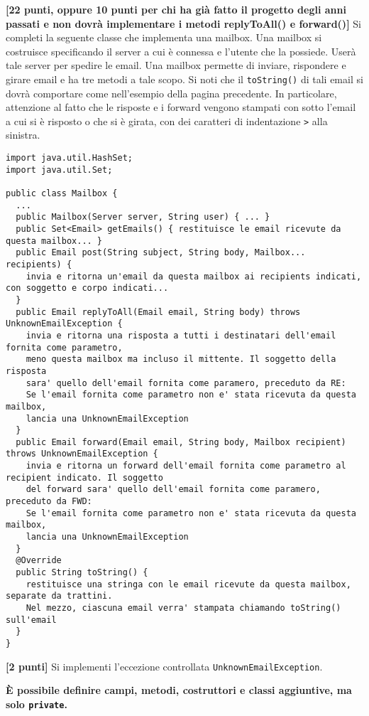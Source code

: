 \documentclass{article}[10pt]
\newcounter{esnu}
\newenvironment{esercizio}{\medskip \noindent {\bf Esercizio\addtocounter{esnu}{1} \arabic{esnu}}}{}
\begin{document}
\begin{esercizio}
\textbf{[22 punti, oppure 10 punti per chi ha gi\`a fatto il progetto degli anni passati e non dovr\`a implementare i metodi replyToAll() e forward()]}
Si completi la seguente classe che implementa una mailbox.
Una mailbox si costruisce specificando il server a cui \`e connessa
e l'utente che la possiede. User\`a tale server per spedire le email.
Una mailbox permette di inviare, rispondere e girare email e ha tre metodi
a tale scopo. Si noti che il \texttt{toString()}
di tali email si dovr\`a comportare come nell'esempio della pagina precedente.
In particolare, attenzione al fatto che le risposte e i forward vengono stampati
con sotto l'email a cui si \`e risposto o che si \`e girata, con dei caratteri
di indentazione \texttt{>} alla sinistra.

{\small\begin{verbatim}
import java.util.HashSet;
import java.util.Set;

public class Mailbox {
  ...
  public Mailbox(Server server, String user) { ... }
  public Set<Email> getEmails() { restituisce le email ricevute da questa mailbox... }
  public Email post(String subject, String body, Mailbox... recipients) {
    invia e ritorna un'email da questa mailbox ai recipients indicati, con soggetto e corpo indicati...
  }
  public Email replyToAll(Email email, String body) throws UnknownEmailException {
    invia e ritorna una risposta a tutti i destinatari dell'email fornita come parametro,
    meno questa mailbox ma incluso il mittente. Il soggetto della risposta
    sara' quello dell'email fornita come paramero, preceduto da RE:
    Se l'email fornita come parametro non e' stata ricevuta da questa mailbox,
    lancia una UnknownEmailException
  }
  public Email forward(Email email, String body, Mailbox recipient) throws UnknownEmailException {
    invia e ritorna un forward dell'email fornita come parametro al recipient indicato. Il soggetto
    del forward sara' quello dell'email fornita come paramero, preceduto da FWD:
    Se l'email fornita come parametro non e' stata ricevuta da questa mailbox,
    lancia una UnknownEmailException
  }
  @Override
  public String toString() {
    restituisce una stringa con le email ricevute da questa mailbox, separate da trattini.
    Nel mezzo, ciascuna email verra' stampata chiamando toString() sull'email
  }
}
\end{verbatim}}

\end{esercizio}

\begin{esercizio}
\textbf{[2 punti]}
Si implementi l'eccezione controllata \texttt{UnknownEmailException}.
\end{esercizio}

\begin{center}
\textbf{\`E possibile definire campi, metodi, costruttori e classi aggiuntive, ma solo \texttt{private}.}
\end{center}
\end{document}
